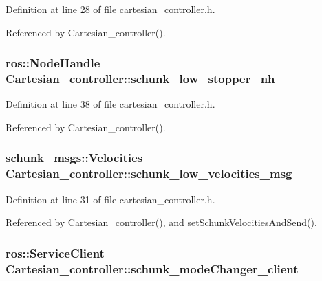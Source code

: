 Definition at line 28 of file cartesian\-\_\-controller.\-h.



Referenced by Cartesian\-\_\-controller().

\hypertarget{classCartesian__controller_a57b1869ec960e75e435e1f882a02d80e}{
\subsubsection[{schunk\-\_\-low\-\_\-stopper\-\_\-nh}]{\setlength{\rightskip}{0pt plus 5cm}ros\-::\-Node\-Handle Cartesian\-\_\-controller\-::schunk\-\_\-low\-\_\-stopper\-\_\-nh\hspace{0.3cm}{\ttfamily [protected]}}}\label{classCartesian__controller_a57b1869ec960e75e435e1f882a02d80e}


Definition at line 38 of file cartesian\-\_\-controller.\-h.



Referenced by Cartesian\-\_\-controller().

\hypertarget{classCartesian__controller_af59178c57bdd73d9eb474577247bbe40}{
\subsubsection[{schunk\-\_\-low\-\_\-velocities\-\_\-msg}]{\setlength{\rightskip}{0pt plus 5cm}schunk\-\_\-msgs\-::\-Velocities Cartesian\-\_\-controller\-::schunk\-\_\-low\-\_\-velocities\-\_\-msg\hspace{0.3cm}{\ttfamily [protected]}}}\label{classCartesian__controller_af59178c57bdd73d9eb474577247bbe40}


Definition at line 31 of file cartesian\-\_\-controller.\-h.



Referenced by Cartesian\-\_\-controller(), and set\-Schunk\-Velocities\-And\-Send().

\hypertarget{classCartesian__controller_aee1fc445b64c534847ff0012132a5d2c}{
\subsubsection[{schunk\-\_\-mode\-Changer\-\_\-client}]{\setlength{\rightskip}{0pt plus 5cm}ros\-::\-Service\-Client Cartesian\-\_\-controller\-::schunk\-\_\-mode\-Changer\-\_\-client\hspace{0.3cm}{\ttfamily [protected]}}}\label{classCartesian__controller_aee1fc445b64c534847ff0012132a5d2c}


